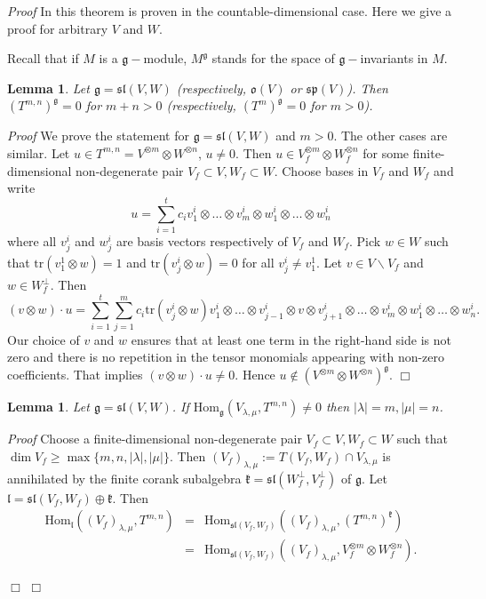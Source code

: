 \documentclass{svmult}
\newtheorem{lem}[theo]{Lemma}
\renewenvironment{proof}{ \emph{Proof}}{$\Box$}
\renewcommand{\sp}{\mathfrak{sp}}
\renewcommand{\sl}{\mathfrak{sl}}
\newcommand{\kk}{\mathfrak{k}}
\newcommand{\oo}{\mathfrak{o}}
\renewcommand{\gg}{\mathfrak{g}}
\newcommand{\tr}{\mathrm{tr}}
\newcommand{\Hom}{\mathrm{Hom}}
\begin{document}
\begin{proof}
In \cite{pstyr} this theorem is proven in the countable-dimensional case. Here we give a proof for arbitrary $V$ and $W$.

Recall that if $M$ is a $\gg-$module, $M^\gg$ stands for the space of $\gg-$invariants in $M$.

\begin{lem}\label{inv} Let $\gg=\sl(V,W)$ (respectively, $\oo(V)$ or $\sp(V)$). Then $(T^{m,n})^\gg=0$ for $m+n>0$ 
(respectively, $(T^m)^\gg=0$ for $m>0$).
\end{lem}
\begin{proof} We prove the statement for $\gg=\sl(V,W)$ and $m>0$. The other cases are similar. Let $u\in T^{m,n} = V^{\otimes m}\otimes W^{\otimes n}$, $u\neq 0$. Then  $u\in V_f^{\otimes m}\otimes W_f^{\otimes n}$ for some finite-dimensional non-degenerate pair $V_f\subset V, W_f\subset W$. Choose bases in $V_f$ and $W_f$ and write $$u=\sum_{i=1}^tc_i v^i_1\otimes\dots\otimes v^i_m\otimes w^i_1\otimes\dots\otimes w^i_n$$ where all $v^i_j$ and $w^i_j$ are basis vectors respectively of $V_f$ and $W_f$. Pick $w\in W$ such that $\tr(v^1_1 \otimes w)=1$ and $\tr(v^i_j \otimes w)=0$ for all $v^i_j\neq v^1_1$. Let $v\in V \backslash V_f$ and $w\in W_f^\perp$. Then $$(v \otimes w)\cdot u =\sum_{i=1}^t\sum_{j=1}^mc_i \tr(v^i_j\otimes w) v^i_1\otimes\dots\otimes v^i_{j-1}\otimes v\otimes v^i_{j+1}\otimes\dots\otimes v^i_m\otimes w^i_1\otimes\dots\otimes w^i_n.$$ Our choice of $v$ and $w$ ensures that at least one term in the right-hand side is not zero and there is no repetition in the tensor monomials appearing 
with non-zero coefficients. That implies $(v \otimes w)\cdot u \neq 0$. Hence $u\notin  (V^{\otimes m}\otimes W^{\otimes n})^\gg$.
\end{proof}

\begin{lem}\label{soclemma1} Let $\gg = \sl(V,W)$. If $\Hom_\gg(V_{\lambda,\mu}, T^{m,n})\neq 0$ then $|\lambda|=m,|\mu|=n$.
\end{lem}

\begin{proof} Choose a finite-dimensional non-degenerate pair $V_f\subset V, W_f\subset W$ such that $\dim V_f\geq \operatorname{max}\lbrace m,n,|\lambda|,|\mu|\rbrace$. Then $(V_f)_{\lambda,\mu}:=T(V_f,W_f)\cap V_{\lambda,\mu}$ is annihilated by the finite corank subalgebra $\kk=\sl(W_f^\perp,V_f^\perp)$ of $\gg$. Let $\mathfrak l=\sl(V_f,W_f)\oplus \kk$. Then 
\begin{eqnarray}
\Hom_{\mathfrak l}((V_f)_{\lambda,\mu},T^{m,n})&=&\Hom_{\sl(V_f,W_f)}((V_f)_{\lambda,\mu},(T^{m,n})^\kk)\nonumber\\
&=& \Hom_{\sl(V_f,W_f)}((V_f)_{\lambda,\mu},V_f^{\otimes m}\otimes W_f^{\otimes n}).\nonumber 
\end{eqnarray}


\end{proof}
\end{proof}
\end{document}
